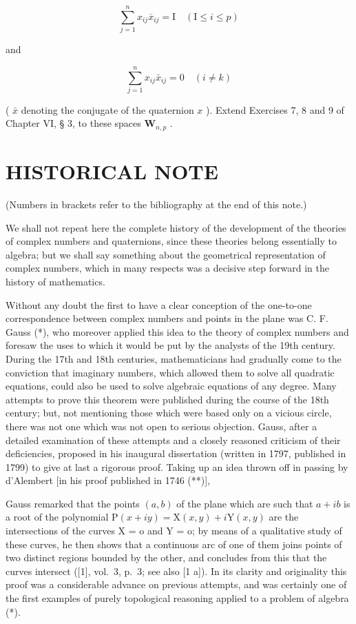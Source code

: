 \[
\sum_ {j = 1} ^ {n} x _ {i j} \overline {{{x}}} _ {i j} = \mathrm{I} \quad (\mathrm{I} \leqslant i \leqslant p)
\]

and

\[
\sum_ {j = 1} ^ {n} x _ {i j} \bar {x} _ {i j} = 0 \quad (i \neq k)
\]

( \(\bar{x}\) denoting the conjugate of the quaternion \(x\) ). Extend Exercises 7, 8 and 9 of Chapter VI, § 3, to these spaces \(\mathbf{W}_{n,p}\) .

\section*{HISTORICAL NOTE}
{}

(Numbers in brackets refer to the bibliography at the end of this note.)

We shall not repeat here the complete history of the development of the theories of complex numbers and quaternions, since these theories belong essentially to algebra; but we shall say something about the geometrical representation of complex numbers, which in many respects was a decisive step forward in the history of mathematics.

Without any doubt the first to have a clear conception of the one-to-one correspondence between complex numbers and points in the plane was C. F. Gauss (*), who moreover applied this idea to the theory of complex numbers and foresaw the uses to which it would be put by the analysts of the 19th century. During the 17th and 18th centuries, mathematicians had gradually come to the conviction that imaginary numbers, which allowed them to solve all quadratic equations, could also be used to solve algebraic equations of any degree. Many attempts to prove this theorem were published during the course of the 18th century; but, not mentioning those which were based only on a vicious circle, there was not one which was not open to serious objection. Gauss, after a detailed examination of these attempts and a closely reasoned criticism of their deficiencies, proposed in his inaugural dissertation (written in 1797, published in 1799) to give at last a rigorous proof. Taking up an idea thrown off in passing by d'Alembert {[}in his proof published in 1746 (**){]},

Gauss remarked that the points \((a, b)\) of the plane which are such that \(a + ib\) is a root of the polynomial \(\mathrm{P}(x + iy) = \mathrm{X}(x, y) + i\mathrm{Y}(x, y)\) are the intersections of the curves X = o and Y = o; by means of a qualitative study of these curves, he then shows that a continuous arc of one of them joins points of two distinct regions bounded by the other, and concludes from this that the curves intersect ({[}1{]}, vol.~3, p.~3; see also {[}1 a{]}). In its clarity and originality this proof was a considerable advance on previous attempts, and was certainly one of the first examples of purely topological reasoning applied to a problem of algebra (*).

